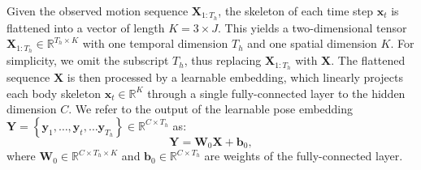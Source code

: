 \documentclass{article}
\begin{document}
Given the observed motion sequence $\mathbf{X}_{1: T_h}$, the skeleton of each time step $\mathbf{x}_{t} $ is flattened into a vector of length $ K = 3 \times J$. This yields a two-dimensional tensor $\mathbf{X}_{1:T_h} \in \mathbb{R}^{T_h\times K}$ with one temporal dimension $T_h$ and one spatial dimension $K$. For simplicity, we omit the subscript $T_h$, thus replacing $\mathbf{X}_{1:T_h}$ with $\mathbf{X}$. The flattened sequence $\mathbf{X}$ is then processed by a learnable embedding, which linearly projects each body skeleton $\mathbf{x}_{t} \in \mathbb{R}^{K}$ through a single fully-connected layer to the hidden dimension $C$. We refer to the output of the learnable pose embedding $\mathbf{Y} = \left\{\mathbf{y}_{1},\ldots,\mathbf{y}_{t}, \ldots  \mathbf{y}_{T_h}\right\} \in \mathbb{R}^{C\times T_h} $ as: 
\begin{equation}
\mathbf{Y} = \mathbf{W}_0 \mathbf{X}  + \mathbf{b}_0, 
\end{equation}
where $\mathbf{W}_0 \in \mathbb{R}^{C\times T_h \times K}$ and $\mathbf{b}_0 \in \mathbb{R}^{C \times T_h}$ are weights of the fully-connected layer. 
\end{document}

